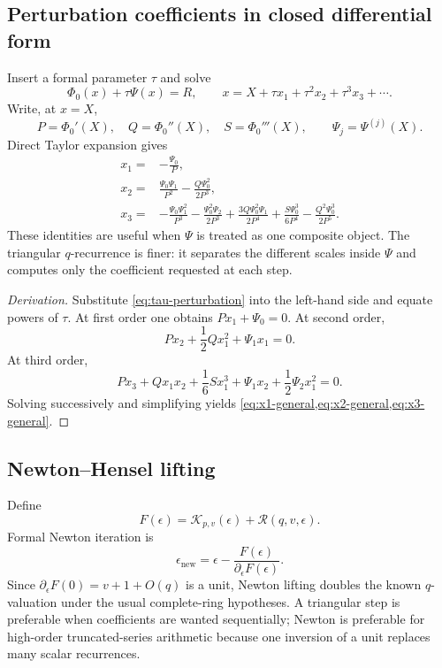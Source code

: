 \documentclass[11pt,oneside]{article}
\theoremstyle{plain}
\theoremstyle{definition}
\theoremstyle{remark}
\newcommand{\Rcal}{\mathcal{R}}
\newcommand{\Kcal}{\mathcal{K}}
\begin{document}
\subsection{Perturbation coefficients in closed differential form}

Insert a formal parameter \(\tau\) and solve
\begin{equation}
 \Phi_0(x)+\tau\Psi(x)=R,
 \qquad
 x=X+\tau x_1+\tau^2x_2+\tau^3x_3+\cdots.
 \label{eq:tau-perturbation}
\end{equation}
Write, at \(x=X\),
\[
 P=\Phi_0'(X),\quad Q=\Phi_0''(X),\quad S=\Phi_0'''(X),
 \qquad
 \Psi_j=\Psi^{(j)}(X).
\]
Direct Taylor expansion gives
\begin{align}
 x_1={}&-\frac{\Psi_0}{P},
 \label{eq:x1-general}\\
 x_2={}&\frac{\Psi_0\Psi_1}{P^2}
 -\frac{Q\Psi_0^2}{2P^3},
 \label{eq:x2-general}\\
 x_3={}&-\frac{\Psi_0\Psi_1^2}{P^3}
 -\frac{\Psi_0^2\Psi_2}{2P^3}
 +\frac{3Q\Psi_0^2\Psi_1}{2P^4}
 +\frac{S\Psi_0^3}{6P^4}
 -\frac{Q^2\Psi_0^3}{2P^5}.
 \label{eq:x3-general}
\end{align}
These identities are useful when \(\Psi\) is treated as one composite object.
The triangular \(q\)-recurrence is finer: it separates the different scales
inside \(\Psi\) and computes only the coefficient requested at each step.

\begin{proof}[Derivation]
Substitute \cref{eq:tau-perturbation} into the left-hand side and equate powers
of \(\tau\).  At first order one obtains \(Px_1+\Psi_0=0\).  At second order,
\[
 Px_2+\frac12Qx_1^2+\Psi_1x_1=0.
\]
At third order,
\[
 Px_3+Qx_1x_2+\frac16Sx_1^3+
 \Psi_1x_2+\frac12\Psi_2x_1^2=0.
\]
Solving successively and simplifying yields
\cref{eq:x1-general,eq:x2-general,eq:x3-general}.
\end{proof}

\subsection{Newton--Hensel lifting}

Define
\[
 F(\epsilon)=\Kcal_{p,v}(\epsilon)+\Rcal(q,v,\epsilon).
\]
Formal Newton iteration is
\begin{equation}
 \epsilon_{\mathrm{new}}
 =\epsilon-\frac{F(\epsilon)}{\partial_\epsilon F(\epsilon)}.
 \label{eq:newton-epsilon}
\end{equation}
Since \(\partial_\epsilon F(0)=v+1+O(q)\) is a unit, Newton lifting doubles the
known \(q\)-valuation under the usual complete-ring hypotheses.  A triangular
step is preferable when coefficients are wanted sequentially; Newton is
preferable for high-order truncated-series arithmetic because one inversion
of a unit replaces many scalar recurrences.
\end{document}
